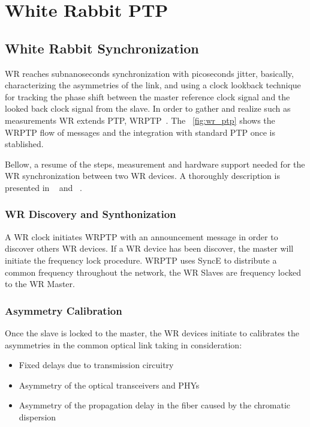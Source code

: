 \section{White Rabbit PTP}
\label{sec:wr}

\subsection{White Rabbit Synchronization}
WR reaches subnanoseconds synchronization with  picoseconds jitter, basically, 
characterizing the asymmetries of the link, and using a clock lookback
technique for tracking the phase shift between the master reference clock
signal and the looked back clock signal from the slave. In order to gather and
realize such as measurements WR extends PTP, WRPTP~\cite{biblio:ispcs_m}. 
The \figurename~\ref{fig:wr_ptp} shows the WRPTP flow of messages and the
integration with standard PTP once is stablished.

Bellow, a resume of the steps, measurement and hardware support needed for the 
WR synchronization between two WR devices. A thoroughly description is presented 
in ~\cite{biblio:tomas} and ~\cite{biblio:wrptp}.

\subsubsection{WR Discovery and Synthonization}

A WR clock initiates WRPTP with an announcement message in order to discover
others WR devices. If a WR device has been discover, the master will initiate the 
frequency lock procedure. WRPTP uses SyncE to distribute a common frequency throughout 
the network, the WR Slaves are frequency locked to the WR Master. 

\subsubsection{Asymmetry Calibration}

Once the slave is locked to the master, the WR devices initiate to calibrates the 
asymmetries in the common optical link taking in consideration:

\begin{itemize}
    \item Fixed delays due to transmission circuitry
    \item Asymmetry of the optical transceivers and PHYs 
    \item Asymmetry of the propagation delay in the fiber caused by the chromatic dispersion
\end{itemize}

